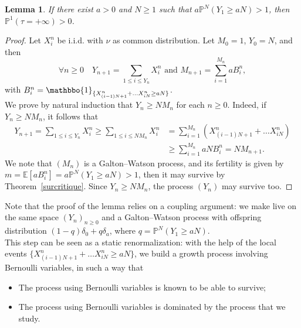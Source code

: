 \documentclass[svgnames]{amsart}
\newcommand{\E}{\ensuremath{\mathbb{E}}}
\renewcommand{\P}{\ensuremath{\mathbb{P}}}
\newcommand{\1}{\mathbbo{1}}
\newtheorem{lemme}{Lemma}
\begin{document}
\begin{lemme}
 If there exist $a>0$ and $N\ge 1$ such that $a\P^N(Y_1\ge aN)>1$, then $\P^1(\tau=+\infty)>0$.
\end{lemme}
\begin{proof}
Let $X_i^n$ be i.i.d. with $\nu$ as common distribution.
Let $M_0=1$, $Y_0=N$, and then 
$$\forall n\ge 0\quad Y_{n+1}=\sum_{1\le i\le Y_n}X_i^n\text{ and }M_{n+1}=\sum_{i=1}^{M_n} aB_i^n,$$
with $B_i^n=\1_{\{X^n_{(i-1)N+1}+\dots X^n_{iN}\ge aN\}}$.\\
We prove by natural induction that $Y_n\ge NM_n$ for each $n\ge 0$. Indeed, if $Y_n\ge NM_n$, it follows that
\begin{align*}
  Y_{n+1}=\sum_{1\le i\le Y_n}X_i^n\ge \sum_{1\le i\le NM_n}X_i^n&=\sum_{i=1}^{M_n}(X^n_{(i-1)N+1}+\dots X^n_{iN})\\&\ge \sum_{i=1}^{M_n} aNB_i^n=NM_{n+1}.
  \end{align*}
We note that $(M_n)$ is a Galton--Watson process, and its fertility is given by\\ $m=\E[aB_i^n]=a\P^N(Y_1\ge aN)>1$, then it may survive by Theorem~\ref{surcritique}.
Since  $Y_n\ge NM_n$, the process $(Y_n)$ may survive too.
\end{proof}
Note that the proof of the lemma relies on a coupling argument: we make live on the same space $(Y_n)_{n\ge 0}$ and a Galton--Watson process with offspring distribution $(1-q)\delta_0+q\delta_{a}$, where $q=\P^N(Y_1\ge aN)$.\\
This step can be seen as a static renormalization: with the  help of the local events $\{X^n_{(i-1)N+1}+\dots X^n_{iN}\ge aN\}$, we build a growth process involving Bernoulli variables, in such a way that
\begin{itemize}
\item The process using Bernoulli variables is known to be able to survive;
\item  The process using Bernoulli variables is dominated by the process that we study.
  \end{itemize}
  
\end{document}
